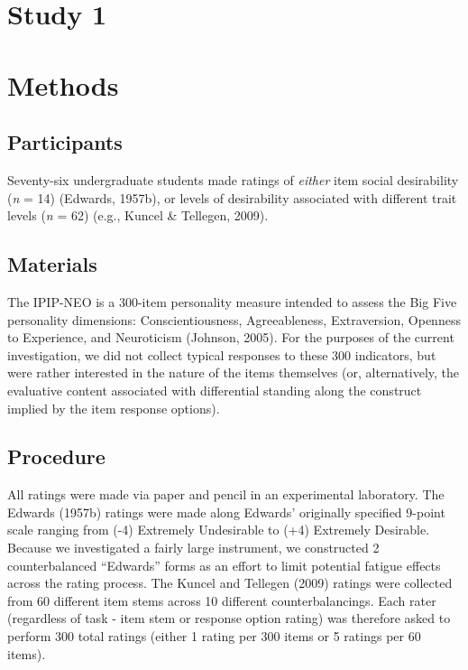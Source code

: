 \documentclass[
  ,man]{apa6}
\begin{document}
\hypertarget{study-1}{%
\section{Study 1}\label{study-1}}

\hypertarget{methods}{%
\section{Methods}\label{methods}}

\hypertarget{participants}{%
\subsection{Participants}\label{participants}}

Seventy-six undergraduate students made ratings of \emph{either} item social desirability (\emph{n} = 14) (Edwards, 1957b), or levels of desirability associated with different trait levels (\emph{n} = 62) (e.g., Kuncel \& Tellegen, 2009).

\hypertarget{materials}{%
\subsection{Materials}\label{materials}}

The IPIP-NEO is a 300-item personality measure intended to assess the Big Five personality dimensions: Conscientiousness, Agreeableness, Extraversion, Openness to Experience, and Neuroticism (Johnson, 2005). For the purposes of the current investigation, we did not collect typical responses to these 300 indicators, but were rather interested in the nature of the items themselves (or, alternatively, the evaluative content associated with differential standing along the construct implied by the item response options).

\hypertarget{procedure}{%
\subsection{Procedure}\label{procedure}}

All ratings were made via paper and pencil in an experimental laboratory. The Edwards (1957b) ratings were made along Edwards' originally specified 9-point scale ranging from (-4) Extremely Undesirable to (+4) Extremely Desirable. Because we investigated a fairly large instrument, we constructed 2 counterbalanced ``Edwards'' forms as an effort to limit potential fatigue effects across the rating process. The Kuncel and Tellegen (2009) ratings were collected from 60 different item stems across 10 different counterbalancings. Each rater (regardless of task - item stem or response option rating) was therefore asked to perform 300 total ratings (either 1 rating per 300 items or 5 ratings per 60 items).
\end{document}
